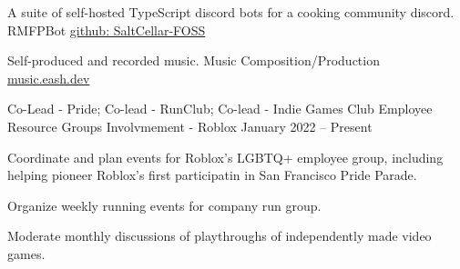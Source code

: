 \documentclass[]{awesome-cv}
\begin{document}
	\vspace{-6mm}
	\projentry
	{A suite of self-hosted TypeScript discord bots for a cooking community discord.}
	{RMFPBot}
	{\href{https://github.com/SaltCellar-FOSS}{github: SaltCellar-FOSS}}
	{}
	{}

	\vspace{-6mm}
	\projentry
	{Self-produced and recorded music.}
	{Music Composition/Production}
	{\href{https://music.eash.dev}{music.eash.dev}}
	{}
	{}
	
	\vspace{-5mm}
	

\vspace{-2mm}
	\cventry
	{Co-Lead - Pride; Co-lead - RunClub; Co-lead - Indie Games Club}
	{Employee Resource Groups Involvmement - Roblox}
	{}
	{January 2022 – Present}
	{\begin{cvitems}
		\item {Coordinate and plan events for Roblox's LGBTQ+ employee group, including helping pioneer Roblox's first participatin in San Francisco Pride Parade.}
		\item {Organize weekly running events for company run group.}
		\item {Moderate monthly discussions of playthroughs of independently made video games.}
		\end{cvitems}}

	\vspace{-4mm}

	
\end{document}
